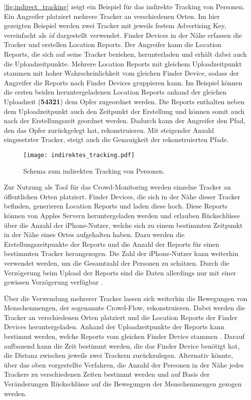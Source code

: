 \autoref{fig:indirect_tracking} zeigt ein Beispiel für das indirekte Tracking von Personen.
Ein Angreifer platziert mehrere Tracker an verschiedenen Orten.
Im hier gezeigten Beispiel werden zwei Tracker mit jeweils festem Advertising Key, vereinfacht als \textit{id} dargestellt verwendet.
Finder Devices in der Nähe erfassen die Tracker und erstellen Location Reports.
Der Angreifer kann die Location Reports, die sich auf seine Tracker beziehen, herunterladen und erhält dabei auch die Uploadzeitpunkte.
Mehrere Location Reports mit gleichem Uploadzeitpunkt stammen mit hoher Wahrscheinlichkeit vom gleichen Finder Device, sodass der Angreifer die Reports nach Finder Devices gruppieren kann.
Im Beispiel können die ersten beiden heruntergeladenen Location Reports anhand der gleichen Uploadzeit (\textbf{54321}) dem Opfer zugeordnet werden.
Die Reports enthalten neben dem Uploadzeitpunkt auch den Zeitpunkt der Erstellung und können somit auch nach der Erstellungszeit geordnet werden.
Dadurch kann der Angreifer den Pfad, den das Opfer zurückgelegt hat, rekonstruieren.
Mit steigender Anzahl eingesetzter Tracker, steigt auch die Genauigkeit der rekonstruierten Pfade.
\begin{figure}[ht]
  \centering
  \texttt{[image: indirektes\_tracking.pdf]}
  \caption{Schema zum indirekten Tracking von Personen.}
  \label{fig:indirect_tracking}
\end{figure}

Zur Nutzung als Tool für das Crowd-Monitoring werden einzelne Tracker an öffentlichen Orten platziert.
Finder Devices, die sich in der Nähe dieser Tracker befinden, generieren Location Reports und laden diese hoch.
Diese Reports können von Apples Servern heruntergeladen werden und erlauben Rückschlüsse über die Anzahl der iPhone-Nutzer, welche sich zu einem bestimmten Zeitpunkt in der Nähe eines Ortes aufgehalten haben.
Dazu werden die Erstellungszeitpunkte der Reports und die Anzahl der Reports für einen bestimmten Tracker herangezogen.
Die Zahl der iPhone-Nutzer kann weiterhin verwendet werden, um die Gesamtzahl der Personen zu schätzen.
Durch die Verzögerung beim Upload der Reports sind die Daten allerdings nur mit einer gewissen Verzögerung verfügbar \cite{Tonetto_FindMy}.

Über die Verwendung mehrerer Tracker lassen sich weiterhin die Bewegungen von Menschenmengen, der sogenannte Crowd-Flow, rekonstruieren.
Dabei werden die Tracker an verschiedenen Orten platziert und die Location Reports der Finder Devices heruntergeladen.
Anhand der Uploadzeitpunkte der Reports kann bestimmt werden, welche Reports vom gleichen Finder Device stammen \cite{Tonetto_FindMy}.
Darauf aufbauend kann die Zeit bestimmt werden, die das Finder Device benötigt hat, die Distanz zwischen jeweils zwei Trackern zurückzulegen.
Alternativ könnte, über das oben vorgestellte Verfahren, die Anzahl der Personen in der Nähe jedes Trackers zu verschiedenen Zeiten bestimmt werden und auf Basis der Veränderungen Rückschlüsse auf die Bewegungen der Menschenmengen gezogen werden.



